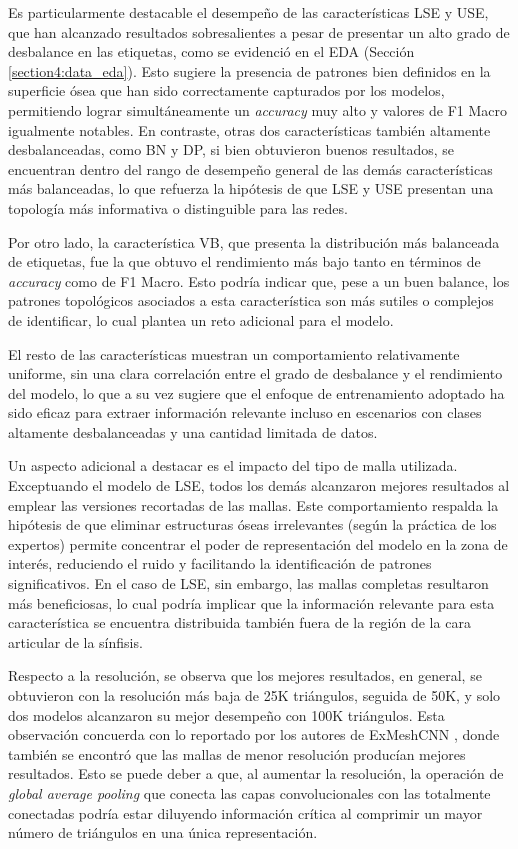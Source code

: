 Es particularmente destacable el desempeño de las características LSE y USE, que han alcanzado resultados sobresalientes a pesar de presentar un alto grado de desbalance en las etiquetas, como se evidenció en el EDA (Sección \ref{section4:data_eda}). Esto sugiere la presencia de patrones bien definidos en la superficie ósea que han sido correctamente capturados por los modelos, permitiendo lograr simultáneamente un \textit{accuracy} muy alto y valores de F1 Macro igualmente notables. En contraste, otras dos características también altamente desbalanceadas, como BN y DP, si bien obtuvieron buenos resultados, se encuentran dentro del rango de desempeño general de las demás características más balanceadas, lo que refuerza la hipótesis de que LSE y USE presentan una topología más informativa o distinguible para las redes.

Por otro lado, la característica VB, que presenta la distribución más balanceada de etiquetas, fue la que obtuvo el rendimiento más bajo tanto en términos de \textit{accuracy} como de F1 Macro. Esto podría indicar que, pese a un buen balance, los patrones topológicos asociados a esta característica son más sutiles o complejos de identificar, lo cual plantea un reto adicional para el modelo.

El resto de las características muestran un comportamiento relativamente uniforme, sin una clara correlación entre el grado de desbalance y el rendimiento del modelo, lo que a su vez sugiere que el enfoque de entrenamiento adoptado ha sido eficaz para extraer información relevante incluso en escenarios con clases altamente desbalanceadas y una cantidad limitada de datos.

Un aspecto adicional a destacar es el impacto del tipo de malla utilizada. Exceptuando el modelo de LSE, todos los demás alcanzaron mejores resultados al emplear las versiones recortadas de las mallas. Este comportamiento respalda la hipótesis de que eliminar estructuras óseas irrelevantes (según la práctica de los expertos) permite concentrar el poder de representación del modelo en la zona de interés, reduciendo el ruido y facilitando la identificación de patrones significativos. En el caso de LSE, sin embargo, las mallas completas resultaron más beneficiosas, lo cual podría implicar que la información relevante para esta característica se encuentra distribuida también fuera de la región de la cara articular de la sínfisis.

Respecto a la resolución, se observa que los mejores resultados, en general, se obtuvieron con la resolución más baja de 25K triángulos, seguida de 50K, y solo dos modelos alcanzaron su mejor desempeño con 100K triángulos. Esta observación concuerda con lo reportado por los autores de ExMeshCNN \cite{kim_exmeshcnn_2022}, donde también se encontró que las mallas de menor resolución producían mejores resultados. Esto se puede deber a que, al aumentar la resolución, la operación de \textit{global average pooling} que conecta las capas convolucionales con las totalmente conectadas podría estar diluyendo información crítica al comprimir un mayor número de triángulos en una única representación.

